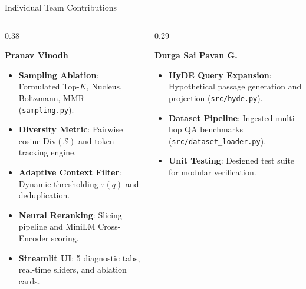 \documentclass[10pt,aspectratio=169]{beamer}
\begin{document}
\begin{frame}{Individual Team Contributions}
    \begin{columns}[onlytextwidth,T]
        \begin{column}{0.38\textwidth}
            \begin{block}{\textbf{Pranav Vinodh}}
                \scriptsize
                \begin{itemize}\setlength\itemsep{1.5pt}
                    \item \textbf{Sampling Ablation}: Formulated Top-$K$, Nucleus, Boltzmann, MMR (\texttt{sampling.py}).
                    \item \textbf{Diversity Metric}: Pairwise cosine $\text{Div}(\mathcal{S})$ and token tracking engine.
                    \item \textbf{Adaptive Context Filter}: Dynamic thresholding $\tau(q)$ and deduplication.
                    \item \textbf{Neural Reranking}: Slicing pipeline and MiniLM Cross-Encoder scoring.
                    \item \textbf{Streamlit UI}: 5 diagnostic tabs, real-time sliders, and ablation cards.
                \end{itemize}
            \end{block}
        \end{column}
        
        \begin{column}{0.29\textwidth}
            \begin{block}{\textbf{Durga Sai Pavan G.}}
                \scriptsize
                \begin{itemize}\setlength\itemsep{2pt}
                    \item \textbf{HyDE Query Expansion}: Hypothetical passage generation and projection (\texttt{src/hyde.py}).
                    \item \textbf{Dataset Pipeline}: Ingested multi-hop QA benchmarks (\texttt{src/dataset\_loader.py}).
                    \item \textbf{Unit Testing}: Designed test suite for modular verification.
                \end{itemize}
            \end{block}
        \end{column}


\end{columns}
\end{frame}
\end{document}
